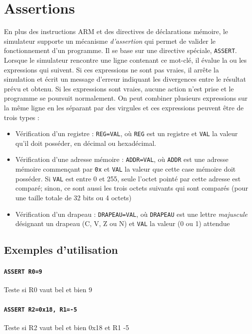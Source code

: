 \documentclass{tufte-handout}
\begin{document}
\clearpage
\section{Assertions}

En plus des instructions ARM et des directives de déclarations mémoire, le simulateur supporte un mécanisme \textit{d'assertion} qui permet de valider le fonctionnement d'un programme. Il se base sur une directive spéciale, \texttt{ASSERT}. Lorsque le simulateur rencontre une ligne contenant ce mot-clé, il évalue la ou les expressions qui suivent. Si ces expressions ne sont pas vraies, il arrête la simulation et écrit un message d'erreur indiquant les divergences entre le résultat prévu et obtenu. Si les expressions sont vraies, aucune action n'est prise et le programme se poursuit normalement. On peut combiner plusieurs expressions sur la même ligne en les séparant par des virgules et ces expressions peuvent être de trois types :
\begin{itemize}
	\item Vérification d'un registre : \texttt{REG=VAL}, où \texttt{REG} est un registre et \texttt{VAL} la valeur qu'il doit posséder, en décimal ou hexadécimal.
	\item Vérification d'une adresse mémoire : \texttt{ADDR=VAL}, où \texttt{ADDR} est une adresse mémoire commençant par \texttt{0x} et \texttt{VAL} la valeur que cette case mémoire doit posséder. Si \texttt{VAL} est entre 0 et 255, seule l'octet pointé par cette adresse est comparé; sinon, ce sont aussi les trois octets suivants qui sont comparés (pour une taille totale de 32 bits ou 4 octets)
	\item Vérification d'un drapeau : \texttt{DRAPEAU=VAL}, où \texttt{DRAPEAU} est une lettre \textit{majuscule} désignant un drapeau (C, V, Z ou N) et \texttt{VAL} la valeur (0 ou 1) attendue
\end{itemize}

\subsection{Exemples d'utilisation}

\paragraph{\texttt{ASSERT R0=9}} Teste si R0 vaut bel et bien 9

\paragraph{\texttt{ASSERT R2=0x18, R1=-5}} Teste si R2 vaut bel et bien 0x18 et R1 -5
\end{document}

